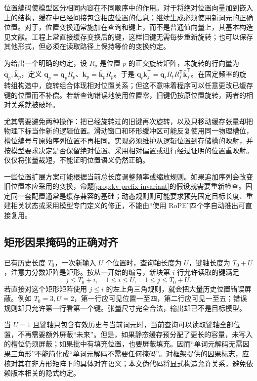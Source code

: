 \documentclass[UTF8,12pt,a4paper,fontset=fandol]{ctexart}
\begin{document}
位置编码使模型区分相同内容在不同顺序中的作用。对于将绝对位置向量加到嵌入上的结构，缓存中已经间接包含相应位置的信息；继续生成必须使用新词元的正确位置。对于，位置变换通常施加在查询和键上，而不是普通值向量上，其基本构造见文献\cite{rope}。工程上常直接缓存变换后的键，这样旧键无需每步重新旋转；也可以保存其他形式，但必须在读取路径上保持等价的变换约定。

为给出一个明确的约定，设 $R_p$ 是位置 $p$ 的正交旋转矩阵，未旋转的行向量为 $\bar{\mathbf q}_p,\bar{\mathbf k}_p$，定义 $\mathbf q_p=\bar{\mathbf q}_pR_p$、$\mathbf k_p=\bar{\mathbf k}_pR_p$。于是 $\mathbf q_t\mathbf k_j^{\mathsf T}=\bar{\mathbf q}_tR_tR_j^{\mathsf T}\bar{\mathbf k}_j^{\mathsf T}$。在固定频率的旋转组构造中，旋转组合体现相对位置关系；但这不意味着程序可以任意更改已缓存键的位置而不补偿。若新查询错误地使用位置零，旧键仍按原位置旋转，两者的相对关系就被破坏。

尤其需要避免两种操作：把已经旋转过的旧键再次旋转，以及只移动缓存张量却把物理下标当作新的逻辑位置。滑动窗口和环形缓冲区可能反复使用同一物理槽位，槽位编号与原始序列位置不再相同。实现必须维护从逻辑位置到存储槽的映射，并按模型要求决定是否保留绝对位置、采用相对偏置或进行经过证明的位置重映射。仅仅将张量裁短，不能证明位置语义仍然正确。

一些位置扩展方案可能根据当前总长度调整频率或缩放规则。如果追加序列会改变旧位置本应采用的变换，命题\ref{prop:kv-prefix-invariant}的假设就需要重新检查。固定同一套配置通常是缓存兼容的基础；动态规则则可能要求预先固定目标长度、重建相关状态或采用模型专门定义的修正，不能由“使用 RoPE”四个字自动推出可直接复用。

\subsection{矩形因果掩码的正确对齐}

已有历史长度 $T_0$，一次新输入 $U$ 个位置时，查询轴长度为 $U$，键轴长度为 $T_0+U$，注意力分数矩阵是矩形。按从一开始的编号，新块第 $i$ 行允许读取的键满足
\begin{equation}
 j\leq T_0+i,\quad 1\leq i\leq U,\quad 1\leq j\leq T_0+U.
 \label{eq:kv-rectangular-mask}
\end{equation}
若直接对这个矩形矩阵使用 $j\leq i$ 的左上角三角规则，就会把大量历史位置错误屏蔽。例如 $T_0=3,U=2$，第一行应可见位置一至四，第二行应可见一至五；错误规则却只允许第一行看第一个键。张量尺寸完全合法，输出却已不是目标模型。

当 $U=1$ 且键轴只包含有效历史与当前词元时，当前查询可以读取键轴全部位置，不再需要额外屏蔽“未来”。但是，如果静态缓存预分配了更长的容量，未写入的槽位仍须屏蔽；如果批中有填充位置，也要屏蔽填充。因而“单词元解码无需因果三角形”不能简化成“单词元解码不需要任何掩码”。对框架提供的因果标志，应核对其在非方形矩阵下的具体对齐语义；本文伪代码将显式构造允许关系，避免依赖版本相关的隐式约定。
\end{document}
